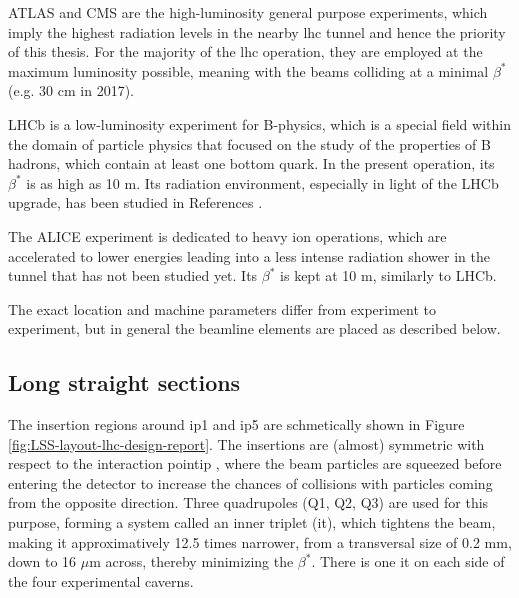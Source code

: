 \documentclass[encoding=utf8,british]{tumphthesis}
\begin{document}
ATLAS and CMS are the high-luminosity general purpose experiments, which imply the highest radiation levels in the nearby \acrshort{lhc} tunnel and hence the priority of this thesis. For the majority of the \acrshort{lhc} operation, they are employed at the maximum luminosity possible, meaning with the beams colliding at a minimal $\beta^{*}$ (e.g. 30 cm in 2017).


LHCb is a low-luminosity experiment for B-physics, which is a special field within the domain of particle physics that focused on the study of the properties of B hadrons, which contain at least one bottom quark. In the present operation, its $\beta^*$ is as high as 10 m. Its radiation environment, especially in light of the LHCb upgrade, has been studied in References \cite{Karacson:2243499,Calviani:1099674}. 

The ALICE experiment is dedicated to heavy ion operations, which are accelerated to lower energies leading into a less intense radiation shower in the tunnel that has not been studied yet. Its $\beta^*$ is kept at 10 m, similarly to LHCb.


The exact location and machine parameters differ from experiment to experiment, but in general the beamline elements are placed as described below.

\subsection{Long straight sections}

The insertion regions around \acrshort{ip}1 and \acrshort{ip}5 are schmetically shown in Figure \ref{fig:LSS-layout-lhc-design-report}. The insertions are (almost) symmetric with respect to the interaction point\acrshort{ip} , where the beam particles are squeezed before entering the detector to increase the chances of collisions with particles coming from the opposite direction. Three quadrupoles (Q1, Q2, Q3) are used for this purpose, forming a system called an inner triplet (\acrshort{it}), which tightens the beam, making it approximatively 12.5 times narrower, from a transversal size of 0.2 mm, down to 16 $\mu$m across, thereby minimizing the $\beta^*$. There is one \acrshort{it} on each side of the four experimental caverns. 
\end{document}

